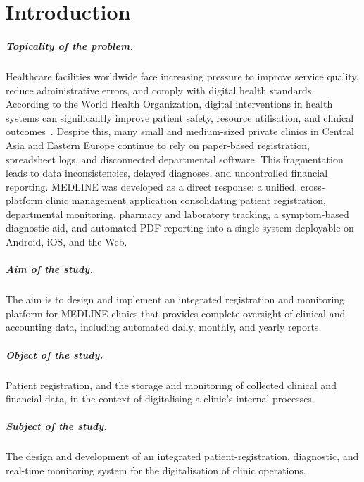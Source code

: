 \documentclass[12pt,a4paper,oneside]{report}
\begin{document}
\tableofcontents
\listoffigures
\listoftables
\clearpage

\chapter*{Introduction}

\paragraph{Topicality of the problem.}
Healthcare facilities worldwide face increasing pressure to improve service
quality, reduce administrative errors, and comply with digital health
standards. According to the World Health Organization, digital interventions in
health systems can significantly improve patient safety, resource utilisation,
and clinical outcomes~\cite{who2019}. Despite this, many small and
medium-sized private clinics in Central Asia and Eastern Europe continue to
rely on paper-based registration, spreadsheet logs, and disconnected
departmental software. This fragmentation leads to data inconsistencies,
delayed diagnoses, and uncontrolled financial reporting. MEDLINE was developed
as a direct response: a unified, cross-platform clinic management application
consolidating patient registration, departmental monitoring, pharmacy and
laboratory tracking, a symptom-based diagnostic aid, and automated PDF
reporting into a single system deployable on Android, iOS, and the Web.

\paragraph{Aim of the study.}
The aim is to design and implement an integrated registration and monitoring
platform for MEDLINE clinics that provides complete oversight of clinical and
accounting data, including automated daily, monthly, and yearly reports.

\paragraph{Object of the study.}
Patient registration, and the storage and monitoring of collected clinical and
financial data, in the context of digitalising a clinic's internal processes.

\paragraph{Subject of the study.}
The design and development of an integrated patient-registration, diagnostic,
and real-time monitoring system for the digitalisation of clinic operations.
\end{document}
